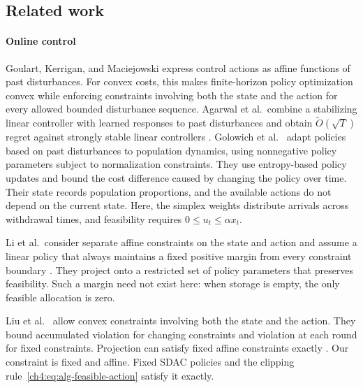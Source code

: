 \subsection{Related work}
\label{ch4:sec:related-work}

\paragraph{Online control}
Goulart, Kerrigan, and Maciejowski
\cite{goulart2006optimization} express control actions as affine functions
of past disturbances. For convex costs, this makes finite-horizon policy
optimization convex while enforcing constraints involving both the state
and the action for every allowed bounded disturbance sequence. Agarwal
et al.\ combine a stabilizing linear controller with learned responses to past disturbances
and obtain $\widetilde O(\sqrt{T})$ regret against strongly stable linear
controllers \cite{agarwal2019online}. Golowich et al.\
\cite{golowich2024population} adapt policies based on past disturbances to
population dynamics, using nonnegative policy parameters subject to
normalization constraints. They use entropy-based policy updates and bound
the cost difference caused by changing the policy over time. Their state
records population proportions, and the available actions do not depend
on the current state. Here, the simplex weights distribute arrivals across
withdrawal times, and feasibility requires
$0\le u_t\le\alpha x_t$.

Li et al.\ consider separate affine constraints on the state and action
and assume a linear policy that always maintains a fixed positive margin
from every constraint boundary \cite{li2021onlineConstrained}. They
project onto a restricted set of policy parameters that preserves
feasibility. Such a margin need not exist here: when storage is empty,
the only feasible allocation is zero.

Liu et al.\ \cite{liu2023constrainedControl} allow convex constraints
involving both the state and the action. They bound accumulated violation
for changing constraints and violation at each round for fixed constraints.
Projection can satisfy fixed affine constraints exactly
\cite[Table~1]{liu2023constrainedControl}. Our constraint is fixed and
affine. Fixed SDAC policies and the clipping
rule~\eqref{ch4:eq:alg-feasible-action} satisfy it exactly.

